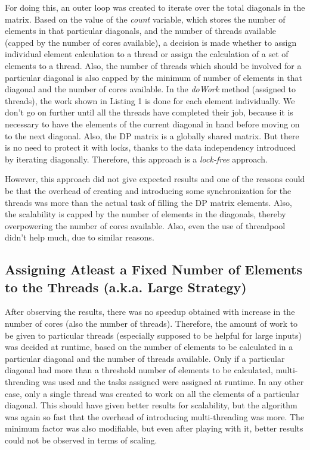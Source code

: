 \documentclass[a4paper,10pt,twoside]{article}
\begin{document}
For doing this, an outer loop was created to iterate over the total diagonals in the matrix. Based on the value of the \textit{count} variable, which stores the number of elements in that particular diagonals, and the number of threads available (capped by the number of cores available), a decision is made whether to assign individual element calculation to a thread or assign the calculation of a set of elements to a thread. Also, the number of threads which should be involved for a particular diagonal is also capped by the minimum of number of elements in that diagonal and the number of cores available. In the \textit{doWork} method (assigned to threads), the work shown in Listing 1 is done for each element individually. We don't go on further until all the threads have completed their job, because it is necessary to have the elements of the current diagonal in hand before moving on to the next diagonal. Also, the DP matrix is a globally shared matrix. But there is no need to protect it with locks, thanks to the data independency introduced by iterating diagonally. Therefore, this approach is a \textit{lock-free} approach.

However, this approach did not give expected results and one of the reasons could be that the overhead of creating and introducing some synchronization for the threads was more than the actual task of filling the DP matrix elements. Also, the scalability is capped by the number of elements in the diagonals, thereby overpowering the number of cores available. Also, even the use of threadpool didn't help much, due to similar reasons.

\subsection{Assigning Atleast a Fixed Number of Elements to the Threads (a.k.a. Large Strategy)}
After observing the results, there was no speedup obtained with increase in the number of cores (also the number of threads). Therefore, the amount of work to be given to particular threads (especially supposed to be helpful for large inputs) was decided at runtime, based on the number of elements to be calculated in a particular diagonal and the number of threads available. Only if a particular diagonal had more than a threshold number of elements to be calculated, multi-threading was used and the tasks assigned were assigned at runtime. In any other case, only a single thread was created to work on all the elements of a particular diagonal. This should have given better results for scalability, but the algorithm was again so fast that the overhead of introducing multi-threading was more. The minimum factor was also modifiable, but even after playing with it, better results could not be observed in terms of scaling.
\end{document}
